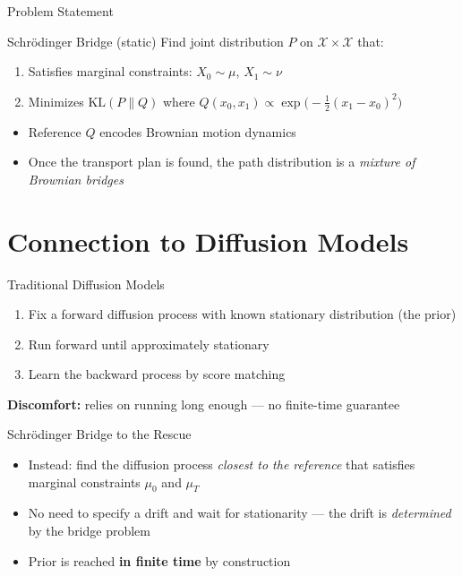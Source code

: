 \documentclass{beamer}
\newcommand{\KL}{\mathrm{KL}}
\begin{document}
\begin{frame}{Problem Statement}
  \begin{block}{Schrödinger Bridge (static)}
    Find joint distribution $P$ on $\mathcal{X} \times \mathcal{X}$ that:
    \begin{enumerate}
      \item Satisfies marginal constraints: $X_0 \sim \mu$, $X_1 \sim \nu$
      \item Minimizes $\KL(P \| Q)$ where $Q(x_0, x_1) \propto \exp\!\bigl(-\tfrac{1}{2}{(x_1 - x_0)}^2\bigr)$
    \end{enumerate}
  \end{block}
  \vspace{0.5em}
  \begin{itemize}
    \item Reference $Q$ encodes Brownian motion dynamics
    \item Once the transport plan is found, the path distribution is a \emph{mixture of Brownian bridges}~\cite{léonard2013surveyschrodingerproblemconnections}
  \end{itemize}
\end{frame}

\section{Connection to Diffusion Models}

\begin{frame}{Traditional Diffusion Models}
  \begin{enumerate}
    \item Fix a forward diffusion process with known stationary distribution (the prior)
    \item Run forward until approximately stationary
    \item Learn the backward process by score matching
  \end{enumerate}
  \vspace{0.5em}
  \textbf{Discomfort:} relies on running long enough — no finite-time guarantee
\end{frame}

\begin{frame}{Schrödinger Bridge to the Rescue}
  \begin{itemize}
    \item Instead: find the diffusion process \emph{closest to the reference} that satisfies marginal constraints $\mu_0$ and $\mu_T$
    \item No need to specify a drift and wait for stationarity — the drift is \emph{determined} by the bridge problem
    \item Prior is reached \textbf{in finite time} by construction~\cite{debortoli2023diffusionschrodingerbridgeapplications}
  \end{itemize}
\end{frame}
\end{document}
